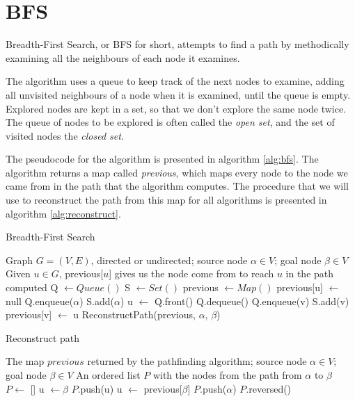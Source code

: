 \documentclass[12pt]{report}
\begin{document}
\section{BFS}
Breadth-First Search, or BFS for short, attempts to find a path by methodically examining all the neighbours of each node it examines.

The algorithm uses a queue to keep track of the next nodes to examine, adding all unvisited neighbours of a node when it is examined, until the queue is empty. Explored nodes are kept in a set, so that we don't explore the same node twice. The queue of nodes to be explored is often called the \emph{open set}, and the set of visited nodes the \emph{closed set}.

The pseudocode for the algorithm is presented in algorithm \ref{alg:bfs}. The algorithm returns a map called \emph{previous}, which maps every node to the node we came from in the path that the algorithm computes. The procedure that we will use to reconstruct the path from this map for all algorithms is presented in algorithm \ref{alg:reconstruct}.

\begin{algorithm}
\caption{Breadth-First Search}
\label{alg:bfs}
\begin{algorithmic}[1]
\Require Graph $G = (V, E)$, directed or undirected; source node $\alpha \in V$; goal node $\beta \in V$
\Ensure Given $u \in G$, previous[$u$] gives us the node come from to reach $u$ in the path computed
\State Q $\gets Queue()$
\State S $\gets Set()$ 
\State previous $\gets Map()$
	\State previous[u] $\gets$ null
\EndFor
\State Q.enqueue($\alpha$)
\State S.add($\alpha$)
	\State u $\gets$ Q.front()
	\State Q.dequeue()
			\State Q.enqueue(v)
			\State S.add(v)
			\State previous[v] $\gets$ u
		\EndIf
	\EndFor
\EndWhile
\State \Return ReconstructPath(previous, $\alpha$, $\beta$)
\EndProcedure
\end{algorithmic}
\end{algorithm}

\begin{algorithm}
\caption{Reconstruct path}
\label{alg:reconstruct}
\begin{algorithmic}[1]
\Require The map $previous$ returned by the pathfinding algorithm; source node $\alpha \in V$; goal node $\beta \in V$
\Ensure An ordered list $P$ with the nodes from the path from $\alpha$ to $\beta$
\State $P \gets$ []  
\State u $\gets \beta$
	\State $P$.push(u)
	\State u $\gets$ previous[$\beta$]
\EndWhile
\State $P$.push($\alpha$)
\State \Return $P$.reversed()
\EndProcedure
\end{algorithmic}
\end{algorithm}
\end{document}
